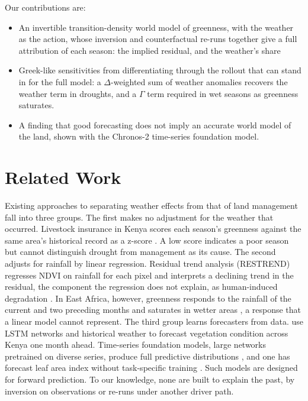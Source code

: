\documentclass[letterpaper]{article} %
\begin{document}
Our contributions are:
\begin{itemize}
    \item An invertible transition-density world model of greenness, with the weather as the action, whose inversion and counterfactual re-runs together give a full attribution of each season: the implied residual, and the weather's share
    \item Greek-like sensitivities from differentiating through the rollout that can stand in for the full model: a $\Delta$-weighted sum of weather anomalies recovers the weather term in droughts, and a $\Gamma$ term required  in wet seasons as greenness saturates.
    \item A finding that good forecasting does not imply an accurate world model of the land, shown with the Chronos-2 time-series foundation model.
\end{itemize}


\section{Related Work}

Existing approaches to separating weather effects from that of land management fall into three groups. The first makes no adjustment for the weather that occurred. Livestock insurance in Kenya scores each season's greenness against the same area's historical record as a z-score \citep{vrieling2014,deoto2019}. A low score indicates a poor season but cannot distinguish drought from management as its cause. The second adjusts for rainfall by linear regression. Residual trend analysis (RESTREND) regresses NDVI on rainfall for each pixel and interprets a declining trend in the residual, the component the regression does not explain, as human-induced degradation \citep{evans2004}. In East Africa, however, greenness responds to the rainfall of the current and two preceding months and saturates in wetter areas \citep{davenport1993}, a response that a linear model cannot represent. The third group learns forecasters from data. \citet{lees2022} use LSTM networks and historical weather to forecast vegetation condition across Kenya one month ahead. Time-series foundation models, large networks pretrained on diverse series, produce full predictive distributions \citep{chronos2}, and one has forecast leaf area index without task-specific training \citep{zhang2025}. Such models are designed for forward prediction. To our knowledge, none are built to explain the past, by inversion on observations or re-runs under another driver path.
\end{document}
